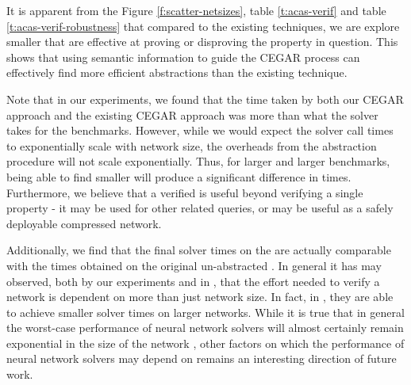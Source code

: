 It is apparent from the Figure \ref{f:scatter-netsizes}, 
table \ref{t:acas-verif} and table \ref{t:acas-verif-robustness} that compared 
to the existing techniques, we are explore smaller \abs that are effective 
at proving or disproving the property in question.
This shows that using semantic information to guide the CEGAR process can
effectively find more efficient abstractions than the existing technique.

Note that in our experiments, we found that the time taken by both our CEGAR
approach and the existing CEGAR approach \cite{cegar-nn} was more than what the
\neuralsat solver takes for the \acasxu benchmarks. However, while we would
expect the solver call times to exponentially scale with network size, the
overheads from the abstraction procedure will not scale exponentially. Thus, for
larger and larger benchmarks, being able to find smaller \abs will produce a
significant difference in times. Furthermore, we believe that a verified \abs is
useful beyond verifying a single property - it may be used for other related
queries, or may be useful as a safely deployable compressed network.

Additionally, we find that the final solver times on the \abs are actually
comparable with the times obtained on the original un-abstracted \cnc. In
general it has may observed, both by our experiments and in \cite{cegar-nn},
that the effort needed to verify a network is dependent
on more than just network size. In fact, in \cite{cegar-nn},
they are able to achieve smaller solver times on larger networks. 
While it is true that in general the worst-case performance of neural network
solvers will almost certainly remain exponential in the size of the network
\cite{reluplex}, other factors on which the performance of neural network
solvers may depend on remains an interesting direction of future work. 

